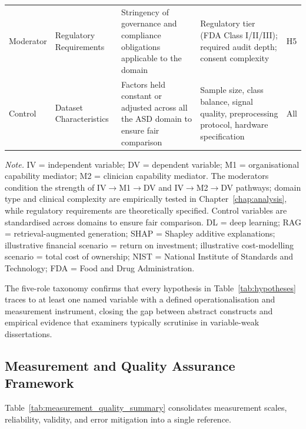 {\begin{xltabular}{\textwidth}{@{} >{\raggedright\arraybackslash}p{1.0cm} >{\raggedright\arraybackslash}p{2.5cm} p{4.9cm} p{4.6cm} >{\raggedright\arraybackslash}p{1.0cm} @{}}
\addlinespace
Moderator & Regulatory Requirements & Stringency of governance and compliance obligations applicable to the domain & Regulatory tier (FDA Class I/II/III); required audit depth; consent complexity & H5 \\
\addlinespace
Control & Dataset Characteristics & Factors held constant or adjusted across all the ASD domain to ensure fair comparison & Sample size, class balance, signal quality, preprocessing protocol, hardware specification & All \\
\end{xltabular}}
\vspace{0.5em}
\noindent\textit{Note.} IV = independent variable; DV = dependent variable; M1 = organisational capability mediator; M2 = clinician capability mediator. The moderators condition the strength of IV$\to$M1$\to$DV and IV$\to$M2$\to$DV pathways; domain type and clinical complexity are empirically tested in Chapter~\ref{chap:analysis}, while regulatory requirements are theoretically specified. Control variables are standardised across domains to ensure fair comparison. DL = deep learning; RAG = retrieval-augmented generation; SHAP = Shapley additive explanations; illustrative financial scenario = return on investment; illustrative cost-modelling scenario = total cost of ownership; NIST = National Institute of Standards and Technology; FDA = Food and Drug Administration.


\noindent The five-role taxonomy confirms that every hypothesis in Table~\ref{tab:hypotheses} traces to at least one named variable with a defined operationalisation and measurement instrument, closing the gap between abstract constructs and empirical evidence that examiners typically scrutinise in variable-weak dissertations.
\fi %

\label{tab:variable_taxonomy}

\iffalse %
\subsection{Measurement and Quality Assurance Framework}
\label{sec:measurement_quality}

Table~\ref{tab:measurement_quality_summary} consolidates measurement scales, reliability, validity, and error mitigation into a single reference.


